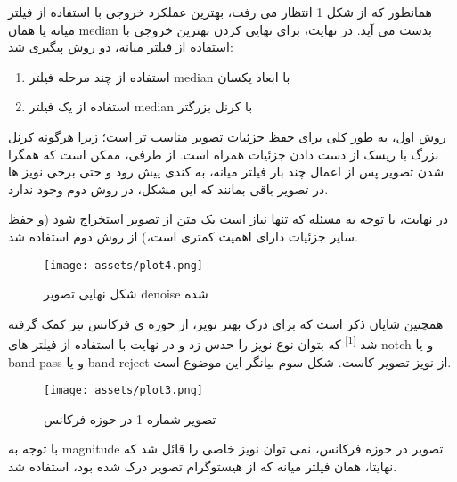 \documentclass[a4paper,12pt]{article}
\begin{document}
همانطور که از شکل 1 انتظار می رفت، بهترین عملکرد خروجی با استفاده از فیلتر میانه یا همان median بدست می آید. در نهایت، برای نهایی کردن بهترین خروجی با استفاده از فیلتر میانه، دو روش پیگیری شد:
\begin{enumerate}
	\item 
	استفاده از چند مرحله فیلتر median با ابعاد یکسان
	\item 
	استفاده از یک فیلتر median با کرنل بزرگتر
\end{enumerate}
روش اول، به طور کلی برای حفظ جزئیات تصویر مناسب تر است؛ زیرا هرگونه کرنل بزرگ  با ریسک از دست دادن جزئیات همراه است. از طرفی، ممکن است که همگرا شدن تصویر پس از اعمال چند بار فیلتر میانه، به کندی پیش رود و حتی برخی نویز ها در تصویر باقی بمانند که این مشکل، در روش دوم وجود ندارد. 

در نهایت، با توجه به مسئله که تنها نیاز است یک متن از تصویر استخراج شود (و حفظ سایر جزئیات دارای اهمیت کمتری است،) از روش دوم استفاده شد.

\begin{figure}[h]
	\centering
	\texttt{[image: assets/plot4.png]}
	\caption{\textcolor{CustomAccent}{شکل نهایی تصویر denoise شده}}
\end{figure}

\pagebreak

همچنین شایان ذکر است که برای درک بهتر نویز، از حوزه ی فرکانس نیز کمک گرفته شد
 \textsuperscript{[1]}  که بتوان نوع نویز را حدس زد و در نهایت با استفاده از فیلتر های notch و یا band-pass و یا band-reject از نویز تصویر کاست. شکل سوم بیانگر این موضوع است.

\begin{figure}[h]
	\centering
	\texttt{[image: assets/plot3.png]}
	\caption{\textcolor{CustomAccent}{تصویر شماره 1 در حوزه فرکانس}}
\end{figure}

با توجه به magnitude تصویر در حوزه فرکانس، نمی توان نویز خاصی را قائل شد که نهایتا، همان فیلتر میانه که از هیستوگرام تصویر درک شده بود، استفاده شد.
\end{document}
